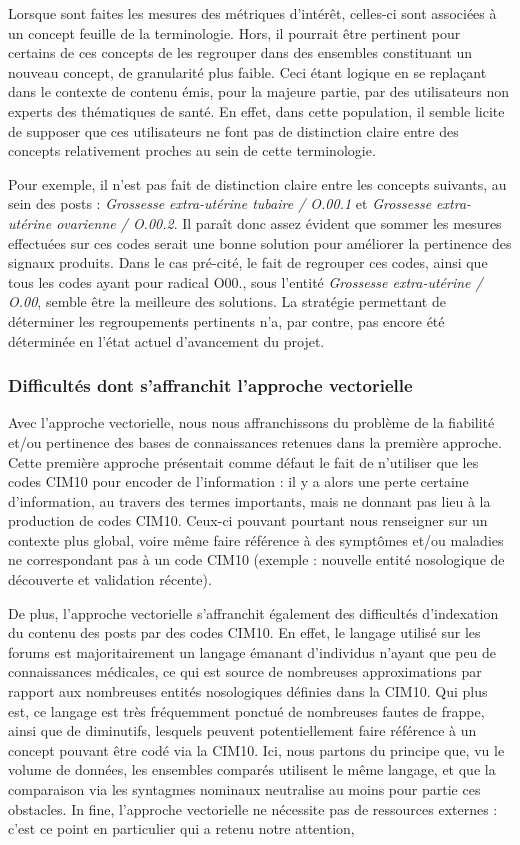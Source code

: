 \documentclass[a4paper, 12pt, openany, oneside, abstract=on]{article} %
\begin{document}
Lorsque sont faites les mesures des métriques d'intérêt, celles-ci sont associées à un \og{}concept feuille\fg{} de la terminologie. Hors, il pourrait être pertinent pour certains de ces concepts de les regrouper dans des ensembles constituant un nouveau concept, de granularité plus faible. Ceci étant logique en se replaçant dans le contexte de contenu émis, pour la majeure partie, par des utilisateurs non experts des thématiques de santé. En effet, dans cette population, il semble licite de supposer que ces utilisateurs ne font pas de distinction claire entre des concepts relativement proches au sein de cette terminologie.

Pour exemple, il n'est pas fait de distinction claire entre les concepts suivants, au sein des posts : \emph{\og{}Grossesse extra-utérine tubaire\fg{} / O.00.1} et \emph{\og{}Grossesse extra-utérine ovarienne\fg{} / O.00.2}.
Il paraît donc assez évident que sommer les mesures effectuées sur ces codes serait une bonne solution pour améliorer la pertinence des signaux produits. Dans le cas pré-cité, le fait de regrouper ces codes, ainsi que tous les codes ayant pour radical \og{}O00.\fg{}, sous l'entité \emph{\og{}Grossesse extra-utérine\fg{} / O.00}, semble être la meilleure des solutions.
La stratégie permettant de déterminer les regroupements pertinents n'a, par contre, pas encore été déterminée en l'état actuel d'avancement du projet.

\subsubsection{Difficultés dont s'affranchit l'approche vectorielle}
\label{LimitesCompaRef}
Avec l'approche vectorielle, nous nous affranchissons du problème de la fiabilité et/ou pertinence des bases de connaissances retenues dans la première approche. Cette première approche présentait comme défaut le fait de n'utiliser que les codes CIM10 pour encoder de l'information : il y a alors une perte certaine d'information, au travers des termes importants, mais ne donnant pas lieu à la production de codes CIM10. Ceux-ci pouvant pourtant nous renseigner sur un contexte plus global, voire même faire référence à des symptômes et/ou maladies ne correspondant pas à un code CIM10 (exemple : nouvelle entité nosologique de découverte et validation récente).

De plus, l'approche vectorielle s'affranchit également des difficultés d'indexation du contenu des posts par des codes CIM10. En effet, le langage utilisé sur les forums est majoritairement un langage émanant d'individus n'ayant que peu de connaissances médicales, ce qui est source de nombreuses approximations par rapport aux nombreuses entités nosologiques définies dans la CIM10. Qui plus est, ce langage est très fréquemment ponctué de nombreuses fautes de frappe, ainsi que de diminutifs, lesquels peuvent potentiellement faire référence à un concept pouvant être codé via la CIM10. Ici, nous partons du principe que, vu le volume de données, les ensembles comparés utilisent le même langage, et que la comparaison via les syntagmes nominaux neutralise au moins pour partie ces obstacles. In fine, l'approche vectorielle ne nécessite pas de ressources externes : c'est ce point en particulier qui a retenu notre attention, 
\end{document}

